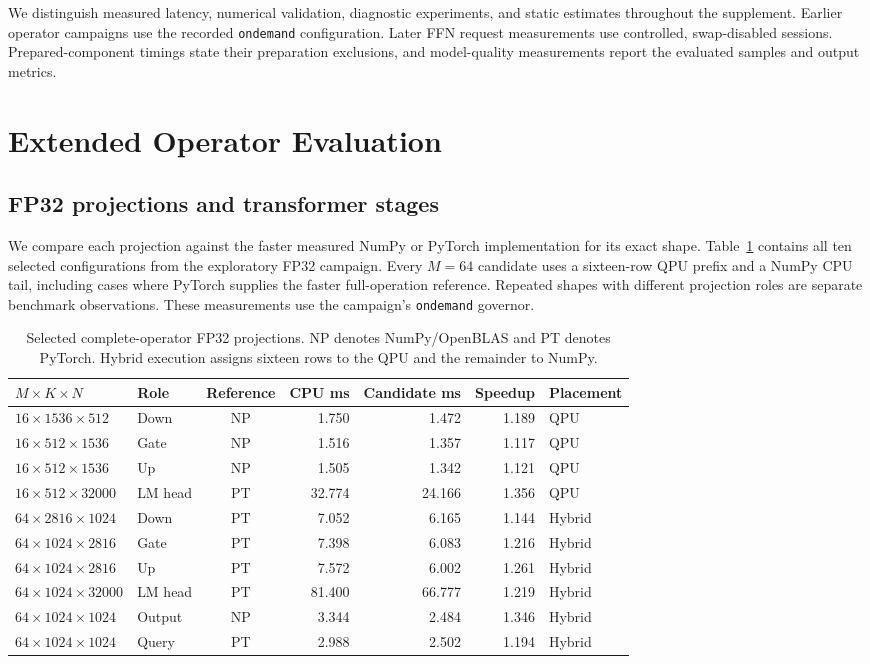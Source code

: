 \documentclass[sigplan,screen,review]{acmart}
\begin{document}
We distinguish measured latency, numerical validation, diagnostic experiments, and static estimates throughout the supplement. Earlier operator campaigns use the recorded \texttt{ondemand} configuration. Later FFN request measurements use controlled, swap-disabled sessions. Prepared-component timings state their preparation exclusions, and model-quality measurements report the evaluated samples and output metrics.

\section{Extended Operator Evaluation}
\label{app:fp32}

\subsection{FP32 projections and transformer stages}

We compare each projection against the faster measured NumPy or PyTorch implementation for its exact shape. Table~\ref{tab:all-projections} contains all ten selected configurations from the exploratory FP32 campaign. Every \(M=64\) candidate uses a sixteen-row QPU prefix and a NumPy CPU tail, including cases where PyTorch supplies the faster full-operation reference. Repeated shapes with different projection roles are separate benchmark observations. These measurements use the campaign's \texttt{ondemand} governor.

\begin{table}[t]
\centering
\caption{Selected complete-operator FP32 projections. NP denotes NumPy/OpenBLAS and PT denotes PyTorch. Hybrid execution assigns sixteen rows to the QPU and the remainder to NumPy.}
\label{tab:all-projections}
\small
\begin{tabular}{@{}llcrrrl@{}}
\toprule
$M\times K\times N$ & Role & Reference & CPU ms & Candidate ms & Speedup & Placement \\
\midrule
$16\times1536\times512$ & Down & NP & 1.750 & 1.472 & 1.189 & QPU \\
$16\times512\times1536$ & Gate & NP & 1.516 & 1.357 & 1.117 & QPU \\
$16\times512\times1536$ & Up & NP & 1.505 & 1.342 & 1.121 & QPU \\
$16\times512\times32000$ & LM head & PT & 32.774 & 24.166 & 1.356 & QPU \\
$64\times2816\times1024$ & Down & PT & 7.052 & 6.165 & 1.144 & Hybrid \\
$64\times1024\times2816$ & Gate & PT & 7.398 & 6.083 & 1.216 & Hybrid \\
$64\times1024\times2816$ & Up & PT & 7.572 & 6.002 & 1.261 & Hybrid \\
$64\times1024\times32000$ & LM head & PT & 81.400 & 66.777 & 1.219 & Hybrid \\
$64\times1024\times1024$ & Output & NP & 3.344 & 2.484 & 1.346 & Hybrid \\
$64\times1024\times1024$ & Query & PT & 2.988 & 2.502 & 1.194 & Hybrid \\
\bottomrule
\end{tabular}
\end{table}
\end{document}
